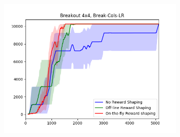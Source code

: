 \begin{figure}[h]
\begin{subfigure}[b]{0.3\textwidth}
	 \end{subfigure}
	 ~ %
	 \begin{subfigure}[b]{0.3\textwidth}
	 	\includegraphics[width=\textwidth]{images/b44-cols-comparison.png}
	 \end{subfigure}
\end{figure}


